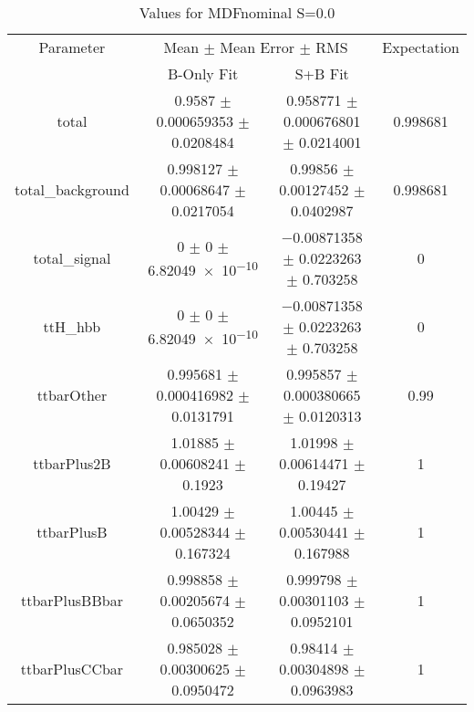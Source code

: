 \begin{table}
\centering
\caption{Values for MDFnominal S=0.0}
\begin{tabular}{cccc}
\toprule
Parameter & \multicolumn{2}{c}{Mean $\pm$ Mean Error $\pm$ RMS} & Expectation\\
 & B-Only Fit & S+B Fit & \\
\midrule
total & \num{0.9587} $\pm$ \num{0.000659353} $\pm$ \num{0.0208484} & \num{0.958771} $\pm$ \num{0.000676801} $\pm$ \num{0.0214001} & \num{0.998681}\\
total\_background & \num{0.998127} $\pm$ \num{0.00068647} $\pm$ \num{0.0217054} & \num{0.99856} $\pm$ \num{0.00127452} $\pm$ \num{0.0402987} & \num{0.998681}\\
total\_signal & \num{0} $\pm$ \num{0} $\pm$ \num{6.82049e-10} & \num{-0.00871358} $\pm$ \num{0.0223263} $\pm$ \num{0.703258} & \num{0}\\
ttH\_hbb & \num{0} $\pm$ \num{0} $\pm$ \num{6.82049e-10} & \num{-0.00871358} $\pm$ \num{0.0223263} $\pm$ \num{0.703258} & \num{0}\\
ttbarOther & \num{0.995681} $\pm$ \num{0.000416982} $\pm$ \num{0.0131791} & \num{0.995857} $\pm$ \num{0.000380665} $\pm$ \num{0.0120313} & \num{0.99}\\
ttbarPlus2B & \num{1.01885} $\pm$ \num{0.00608241} $\pm$ \num{0.1923} & \num{1.01998} $\pm$ \num{0.00614471} $\pm$ \num{0.19427} & \num{1}\\
ttbarPlusB & \num{1.00429} $\pm$ \num{0.00528344} $\pm$ \num{0.167324} & \num{1.00445} $\pm$ \num{0.00530441} $\pm$ \num{0.167988} & \num{1}\\
ttbarPlusBBbar & \num{0.998858} $\pm$ \num{0.00205674} $\pm$ \num{0.0650352} & \num{0.999798} $\pm$ \num{0.00301103} $\pm$ \num{0.0952101} & \num{1}\\
ttbarPlusCCbar & \num{0.985028} $\pm$ \num{0.00300625} $\pm$ \num{0.0950472} & \num{0.98414} $\pm$ \num{0.00304898} $\pm$ \num{0.0963983} & \num{1}\\
\bottomrule
\end{tabular}
\end{table}